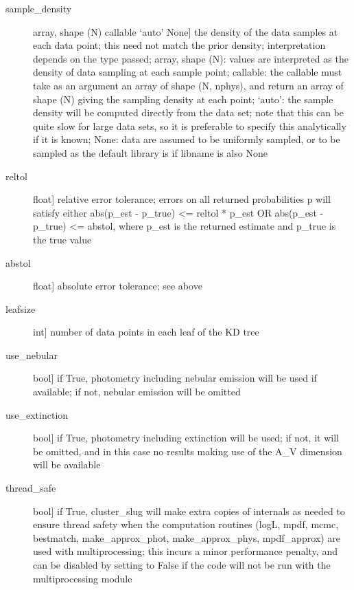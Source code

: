 \documentclass[letterpaper,10pt,english]{sphinxmanual}
\begin{document}
\begin{fulllineitems}
\begin{fulllineitems}
\begin{description}
\begin{description}
\item[{sample\_density}] \leavevmode{[}array, shape (N) \textbar{} callable \textbar{} `auto' \textbar{} None{]}
the density of the data samples at each data point; this
need not match the prior density; interpretation depends
on the type passed; array, shape (N): values are
interpreted as the density of data sampling at each
sample point; callable: the callable must take as an
argument an array of shape (N, nphys), and return an
array of shape (N) giving the sampling density at each
point; `auto': the sample density will be computed
directly from the data set; note that this can be quite
slow for large data sets, so it is preferable to specify
this analytically if it is known; None: data are assumed
to be uniformly sampled, or to be sampled as the default
library is if libname is also None

\item[{reltol}] \leavevmode{[}float{]}
relative error tolerance; errors on all returned
probabilities p will satisfy either
abs(p\_est - p\_true) \textless{}= reltol * p\_est   OR
abs(p\_est - p\_true) \textless{}= abstol,
where p\_est is the returned estimate and p\_true is the
true value

\item[{abstol}] \leavevmode{[}float{]}
absolute error tolerance; see above

\item[{leafsize}] \leavevmode{[}int{]}
number of data points in each leaf of the KD tree

\item[{use\_nebular}] \leavevmode{[}bool{]}
if True, photometry including nebular emission will be
used if available; if not, nebular emission will be
omitted

\item[{use\_extinction}] \leavevmode{[}bool{]}
if True, photometry including extinction will be used;
if not, it will be omitted, and in this case no results
making use of the A\_V dimension will be available

\item[{thread\_safe}] \leavevmode{[}bool{]}
if True, cluster\_slug will make extra copies of internals
as needed to ensure thread safety when the computation
routines (logL, mpdf, mcmc, bestmatch, make\_approx\_phot,
make\_approx\_phys, mpdf\_approx) are used with
multiprocessing; this incurs a minor performance
penalty, and can be disabled by setting to False if the
code will not be run with the multiprocessing module


\end{description}
\end{description}
\end{fulllineitems}
\end{fulllineitems}
\end{document}
